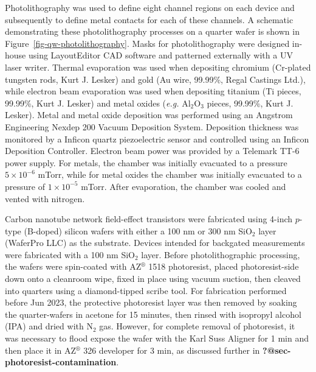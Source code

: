 \documentclass[
  a4paper,
]{scrbook}
\begin{document}
Photolithography was used to define eight channel regions on each device
and subsequently to define metal contacts for each of these channels. A
schematic demonstrating these photolithography processes on a quarter
wafer is shown in Figure~\ref{fig-qw-photolithography}. Masks for
photolithography were designed in-house using LayoutEditor CAD software
and patterned externally with a UV laser writer. Thermal evaporation was
used when depositing chromium (Cr-plated tungsten rods, Kurt J. Lesker)
and gold (Au wire, 99.99\%, Regal Castings Ltd.), while electron beam
evaporation was used when depositing titanium (Ti pieces, 99.99\%, Kurt
J. Lesker) and metal oxides (\emph{e.g.} Al\(_2\)O\(_3\) pieces,
99.99\%, Kurt J. Lesker). Metal and metal oxide deposition was performed
using an Angstrom Engineering Nexdep 200 Vacuum Deposition System.
Deposition thickness was monitored by a Inficon quartz piezoelectric
sensor and controlled using an Inficon Deposition Controller. Electron
beam power was provided by a Telemark TT-6 power supply. For metals, the
chamber was initially evacuated to a pressure \(5 \times 10^{-6}\)
mTorr, while for metal oxides the chamber was initially evacuated to a
pressure of \(1 \times 10^{-5}\) mTorr. After evaporation, the chamber
was cooled and vented with nitrogen.

Carbon nanotube network field-effect transistors were fabricated using
4-inch \(p\)-type (B-doped) silicon wafers with either a 100 nm or 300
nm SiO\(_2\) layer (WaferPro LLC) as the substrate. Devices intended for
backgated measurements were fabricated with a 100 nm SiO\(_2\) layer.
Before photolithographic processing, the wafers were spin-coated with
AZ\(^\circledR\) 1518 photoresist, placed photoresist-side down onto a
cleanroom wipe, fixed in place using vacuum suction, then cleaved into
quarters using a diamond-tipped scribe tool. For fabrication performed
before Jun 2023, the protective photoresist layer was then removed by
soaking the quarter-wafers in acetone for 15 minutes, then rinsed with
isopropyl alcohol (IPA) and dried with N\(_2\) gas. However, for
complete removal of photoresist, it was necessary to flood expose the
wafer with the Karl Suss Aligner for 1 min and then place it in
AZ\(^\circledR\) 326 developer for 3 min, as discussed further in
\textbf{?@sec-photoresist-contamination}.
\end{document}
